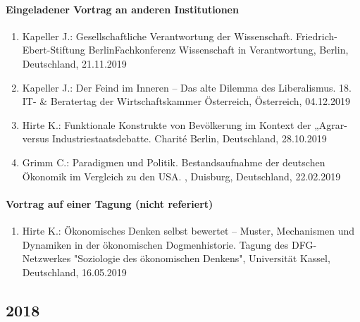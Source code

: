 \paragraph{Eingeladener Vortrag an anderen Institutionen}
\begin{enumerate}
	\item Kapeller J.: Gesellschaftliche Verantwortung der Wissenschaft. Friedrich-Ebert-Stiftung BerlinFachkonferenz Wissenschaft in Verantwortung, Berlin, Deutschland, 21.11.2019
	\item Kapeller J.: Der Feind im Inneren – Das alte Dilemma des Liberalismus. 18. IT- & Beratertag der Wirtschaftskammer Österreich, Österreich, 04.12.2019
	\item Hirte K.: Funktionale Konstrukte von Bevölkerung im Kontext der „Agrar- versus Industriestaatsdebatte. Charité Berlin, Deutschland, 28.10.2019
	\item Grimm C.: Paradigmen und Politik. Bestandsaufnahme der deutschen Ökonomik im Vergleich zu den USA. , Duisburg, Deutschland, 22.02.2019
\end{enumerate}
\paragraph{Vortrag auf einer Tagung (nicht referiert)}
\begin{enumerate}
	\item Hirte K.: Ökonomisches Denken selbst bewertet – Muster, Mechanismen und Dynamiken in der ökonomischen Dogmenhistorie. Tagung des DFG-Netzwerkes "Soziologie des ökonomischen Denkens", Universität Kassel, Deutschland, 16.05.2019
\end{enumerate}
\subsection*{2018}

